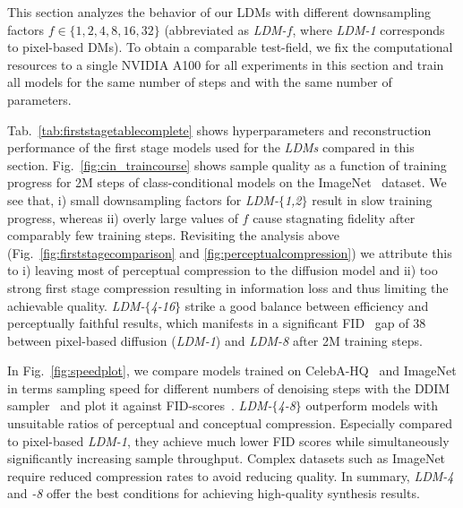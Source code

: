 \documentclass[10pt,twocolumn,letterpaper]{article}
\begin{document}
This section analyzes the behavior of our LDMs with different downsampling
factors $f\in\{1,2,4,8,16,32\}$ (abbreviated as \emph{LDM-}$f$, where
\emph{LDM-1} corresponds to pixel-based DMs).
%
%
%
To obtain a
comparable test-field, we fix the computational resources
%
to a
single NVIDIA A100 for all experiments in this section and train all models for
the same number of steps and with the same number of parameters.

%
Tab.~\ref{tab:firststagetablecomplete} shows hyperparameters and reconstruction performance of the first stage models used for the \emph{LDMs} compared in this section.
%
%
Fig.~\ref{fig:cin_traincourse} shows sample quality as a function of training
progress for 2M steps of class-conditional models on the
ImageNet~\cite{DBLP:conf/cvpr/DengDSLL009} dataset. We see that, i) small
downsampling factors for \emph{LDM-}$\{$\emph{1,2}$\}$ result in slow training
progress, whereas ii) overly large values of $f$ cause stagnating fidelity
after comparably few training steps. Revisiting the analysis above
(Fig.~\ref{fig:firststagecomparison} and \ref{fig:perceptualcompression}) we
attribute this to i) leaving most of perceptual compression to the diffusion
model and ii) too strong first stage compression resulting in information loss
and thus limiting the achievable quality. \emph{LDM-$\{$4-16$\}$}
%
strike a good balance between efficiency and perceptually faithful results,
%
which manifests in a significant FID~\cite{FID} gap of 38 between pixel-based diffusion (\emph{LDM-1}) and \emph{LDM-8} after 2M training steps.

%
In Fig.~\ref{fig:speedplot}, we compare models trained on
CelebA-HQ~\cite{DBLP:journals/corr/abs-1710-10196} and ImageNet in terms
sampling speed for different numbers of denoising steps with the DDIM
sampler~\cite{DBLP:conf/iclr/SongME21} and plot it against FID-scores~\cite{FID}.
\emph{LDM-$\{$4-8$\}$} outperform models 
with unsuitable ratios of perceptual and conceptual compression. 
Especially compared to
pixel-based \emph{LDM-1}, they achieve much lower FID scores while
simultaneously significantly increasing sample throughput.
Complex datasets such as ImageNet require reduced compression rates to avoid
reducing quality.
%
%
%
%
%
%
%
%
In summary, \emph{LDM-4} and \emph{-8} offer the best conditions for achieving high-quality synthesis results.
%
%
%
%
%
%
%
\fidsnew
\texttoimgquantcocotwo
%
%
%

\vspace{-1.0em}
\end{document}
